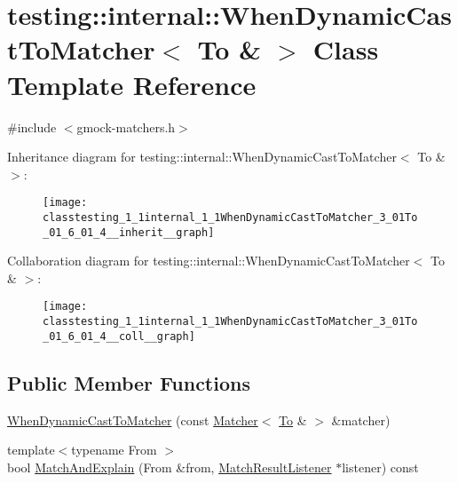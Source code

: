 \hypertarget{classtesting_1_1internal_1_1WhenDynamicCastToMatcher_3_01To_01_6_01_4}{}\section{testing\+:\+:internal\+:\+:When\+Dynamic\+Cast\+To\+Matcher$<$ To \& $>$ Class Template Reference}
\label{classtesting_1_1internal_1_1WhenDynamicCastToMatcher_3_01To_01_6_01_4}


{\ttfamily \#include $<$gmock-\/matchers.\+h$>$}



Inheritance diagram for testing\+:\+:internal\+:\+:When\+Dynamic\+Cast\+To\+Matcher$<$ To \& $>$\+:\nopagebreak
\begin{figure}[H]
\begin{center}
\leavevmode
\texttt{[image: classtesting\_1\_1internal\_1\_1WhenDynamicCastToMatcher\_3\_01To\_01\_6\_01\_4\_\_inherit\_\_graph]}
\end{center}
\end{figure}


Collaboration diagram for testing\+:\+:internal\+:\+:When\+Dynamic\+Cast\+To\+Matcher$<$ To \& $>$\+:\nopagebreak
\begin{figure}[H]
\begin{center}
\leavevmode
\texttt{[image: classtesting\_1\_1internal\_1\_1WhenDynamicCastToMatcher\_3\_01To\_01\_6\_01\_4\_\_coll\_\_graph]}
\end{center}
\end{figure}
\subsection*{Public Member Functions}
\begin{DoxyCompactItemize}
\item 
\hyperlink{classtesting_1_1internal_1_1WhenDynamicCastToMatcher_3_01To_01_6_01_4_a5f292f9497d2da8484082cba38053908}{When\+Dynamic\+Cast\+To\+Matcher} (const \hyperlink{classtesting_1_1Matcher}{Matcher}$<$ \hyperlink{classtesting_1_1internal_1_1To}{To} \& $>$ \&matcher)
\item 
{\footnotesize template$<$typename From $>$ }\\bool \hyperlink{classtesting_1_1internal_1_1WhenDynamicCastToMatcher_3_01To_01_6_01_4_a5459ff45c7b687d42545490226c2f7b2}{Match\+And\+Explain} (From \&from, \hyperlink{classtesting_1_1MatchResultListener}{Match\+Result\+Listener} $\ast$listener) const 
\end{DoxyCompactItemize}
